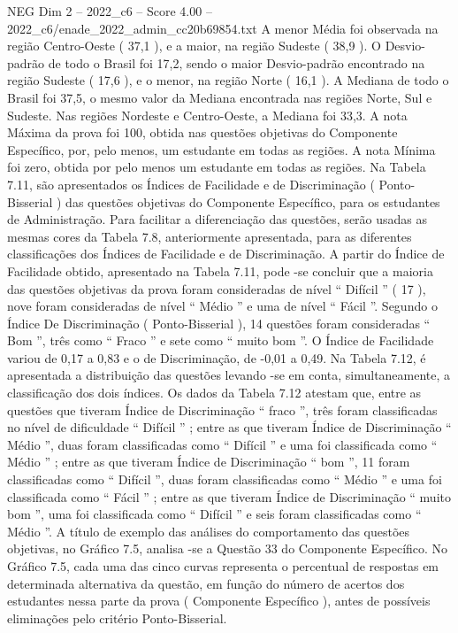 \begin{textsample}{NEG Dim 2 – 2022\_c6 – Score 4.00 – 2022\_c6/enade\_2022\_admin\_cc20b69854.txt}
A menor Média foi observada na região Centro-Oeste ( 37,1 ), e a maior, na região Sudeste ( 38,9 ).
O Desvio-padrão de todo o Brasil foi 17,2, sendo o maior Desvio-padrão encontrado na região Sudeste ( 17,6 ), e o menor, na região Norte ( 16,1 ).
A Mediana de todo o Brasil foi 37,5, o mesmo valor da Mediana encontrada nas regiões Norte, Sul e Sudeste.
Nas regiões Nordeste e Centro-Oeste, a Mediana foi 33,3.
A nota Máxima da prova foi 100, obtida nas questões objetivas do Componente Específico, por, pelo menos, um estudante em todas as regiões.
A nota Mínima foi zero, obtida por pelo menos um estudante em todas as regiões.
Na Tabela 7.11, são apresentados os Índices de Facilidade e de Discriminação ( Ponto-Bisserial ) das questões objetivas do Componente Específico, para os estudantes de Administração.
Para facilitar a diferenciação das questões, serão usadas as mesmas cores da Tabela 7.8, anteriormente apresentada, para as diferentes classificações dos Índices de Facilidade e de Discriminação.
A partir do Índice de Facilidade obtido, apresentado na Tabela 7.11, pode -se concluir que a maioria das questões objetivas da prova foram consideradas de nível “ Difícil ” ( 17 ), nove foram consideradas de nível “ Médio ” e uma de nível “ Fácil ”.
Segundo o Índice De Discriminação ( Ponto-Bisserial ), 14 questões foram consideradas “ Bom ”, três como “ Fraco ” e sete como “ muito bom ”.
O Índice de Facilidade variou de 0,17 a 0,83 e o de Discriminação, de -0,01 a 0,49.
Na Tabela 7.12, é apresentada a distribuição das questões levando -se em conta, simultaneamente, a classificação dos dois índices.
Os dados da Tabela 7.12 atestam que, entre as questões que tiveram Índice de Discriminação “ fraco ”, três foram classificadas no nível de dificuldade “ Difícil ” ; entre as que tiveram Índice de Discriminação “ Médio ”, duas foram classificadas como “ Difícil ” e uma foi classificada como “ Médio ” ; entre as que tiveram Índice de Discriminação “ bom ”, 11 foram classificadas como “ Difícil ”, duas foram classificadas como “ Médio ” e uma foi classificada como “ Fácil ” ; entre as que tiveram Índice de Discriminação “ muito bom ”, uma foi classificada como “ Difícil ” e seis foram classificadas como “ Médio ”.
A título de exemplo das análises do comportamento das questões objetivas, no Gráfico 7.5, analisa -se a Questão 33 do Componente Específico.
No Gráfico 7.5, cada uma das cinco curvas representa o percentual de respostas em determinada alternativa da questão, em função do número de acertos dos estudantes nessa parte da prova ( Componente Específico ), antes de possíveis eliminações pelo critério Ponto-Bisserial.

\end{textsample}
